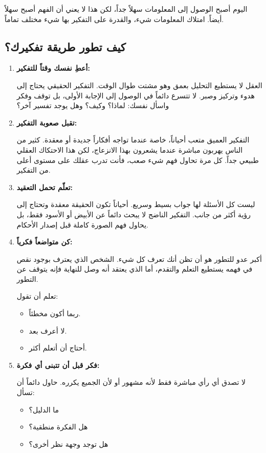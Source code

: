 \documentclass[12pt,a4paper]{book}
\begin{document}
	اليوم أصبح الوصول إلى المعلومات سهلاً جداً، لكن هذا لا يعني أن الفهم أصبح سهلاً أيضاً. امتلاك المعلومات شيء، والقدرة على التفكير بها شيء مختلف تماماً.
	
	\subsection{كيف تطور طريقة تفكيرك؟}
	
	\begin{enumerate}
		\item \textbf{أعطِ نفسك وقتاً للتفكير:}
		
		العقل لا يستطيع التحليل بعمق وهو مشتت طوال الوقت. التفكير الحقيقي يحتاج إلى هدوء وتركيز وصبر. لا تتسرع دائماً في الوصول إلى الإجابة الأولى، بل توقف وفكر واسأل نفسك: لماذا؟ وكيف؟ وهل يوجد تفسير آخر؟
		
		\item \textbf{تقبل صعوبة التفكير:}
		
		التفكير العميق متعب أحياناً، خاصة عندما تواجه أفكاراً جديدة أو معقدة. كثير من الناس يهربون مباشرة عندما يشعرون بهذا الانزعاج، لكن هذا الاحتكاك العقلي طبيعي جداً. كل مرة تحاول فهم شيء صعب، فأنت تدرب عقلك على مستوى أعلى من التفكير.
		
		\item \textbf{تعلّم تحمل التعقيد:}
		
		ليست كل الأسئلة لها جواب بسيط وسريع. أحياناً تكون الحقيقة معقدة وتحتاج إلى رؤية أكثر من جانب. التفكير الناضج لا يبحث دائماً عن الأبيض أو الأسود فقط، بل يحاول فهم الصورة كاملة قبل إصدار الأحكام.
		
		\item \textbf{كن متواضعاً فكرياً:}
		
		أكبر عدو للتطور هو أن تظن أنك تعرف كل شيء. الشخص الذي يعترف بوجود نقص في فهمه يستطيع التعلم والتقدم، أما الذي يعتقد أنه وصل للنهاية فإنه يتوقف عن التطور.
		
		تعلم أن تقول:
		\begin{itemize}
			\item ربما أكون مخطئاً.
			\item لا أعرف بعد.
			\item أحتاج أن أتعلم أكثر.
		\end{itemize}
		
		\item \textbf{فكر قبل أن تتبنى أي فكرة:}
		
		لا تصدق أي رأي مباشرة فقط لأنه مشهور أو لأن الجميع يكرره. حاول دائماً أن تسأل:
		
		\begin{itemize}
			\item ما الدليل؟
			\item هل الفكرة منطقية؟
			\item هل توجد وجهة نظر أخرى؟
		\end{itemize}
		

\end{enumerate}
\end{document}
